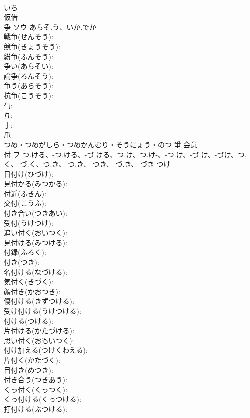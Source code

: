 \documentclass[8pt]{extreport}
\begin{document}
\begin{CJK}{UTF8}{min}
\\	いち	
\\	仮借 
\\	争	ソウ	あらそ.う、いか.でか		
\\	戦争(せんそう): 
\\	競争(きょうそう): 
\\	紛争(ふんそう): 
\\	争い(あらそい): 
\\	論争(ろんそう): 
\\	争う(あらそう): 
\\	抗争(こうそう): 
\\	勹: 
\\	彑: 
\\	亅: 
\\	爪	
\\	つめ・つめがしら・つめかんむり・そうにょう・のつ	爭	会意 
\\	付	フ	つ.ける、-つ.ける、-づ.ける、つ.け、つ.け-、-つ.け、-づ.け、-づけ、つ.く、-づ.く、つ.き、-つ.き、-つき、-づ.き、-づき	つけ	
\\	日付け(ひづけ): 
\\	見付かる(みつかる): 
\\	付近(ふきん): 
\\	交付(こうふ): 
\\	付き合い(つきあい): 
\\	受付(うけつけ): 
\\	追い付く(おいつく): 
\\	見付ける(みつける): 
\\	付録(ふろく): 
\\	付き(つき): 
\\	名付ける(なづける): 
\\	気付く(きづく): 
\\	顔付き(かおつき): 
\\	傷付ける(きずつける): 
\\	受け付ける(うけつける): 
\\	付ける(つける): 
\\	片付ける(かたづける): 
\\	思い付く(おもいつく): 
\\	付け加える(つけくわえる): 
\\	片付く(かたづく): 
\\	目付き(めつき): 
\\	付き合う(つきあう): 
\\	くっ付く(くっつく): 
\\	くっ付ける(くっつける): 
\\	打付ける(ぶつける): 

\end{CJK}
\end{document}
